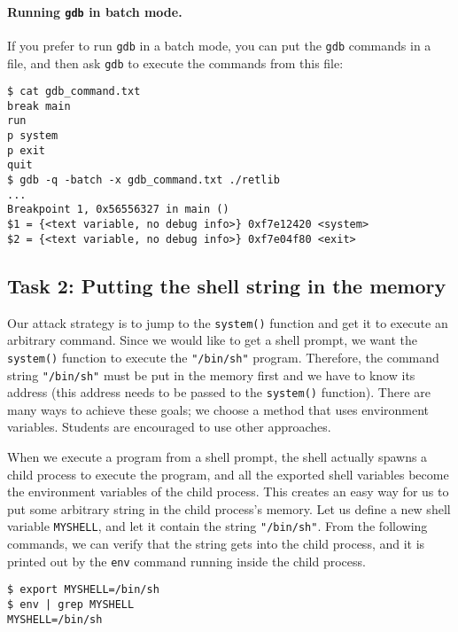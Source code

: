 \paragraph{Running \texttt{gdb} in batch mode.} If you prefer to run \texttt{gdb} 
in a batch mode, you can put the \texttt{gdb} commands in a file, and then 
ask \texttt{gdb} to execute the commands from this file:

\begin{lstlisting}
$ cat gdb_command.txt
break main
run
p system
p exit
quit
$ gdb -q -batch -x gdb_command.txt ./retlib
...
Breakpoint 1, 0x56556327 in main ()
$1 = {<text variable, no debug info>} 0xf7e12420 <system>
$2 = {<text variable, no debug info>} 0xf7e04f80 <exit>
\end{lstlisting}
 



\subsection{Task 2: Putting the shell string in the memory}

Our attack strategy is to jump to the \texttt{system()} function and 
get it to execute an arbitrary command. Since we would like to 
get a shell prompt, we want the \texttt{system()} function
to execute the \texttt{"/bin/sh"} program. Therefore, the 
command string \texttt{"/bin/sh"} must be put in the memory first and 
we have to know its address (this address needs to be passed to 
the \texttt{system()} function). There are many ways to
achieve these goals; we choose a method that uses environment variables.
Students are encouraged to use other approaches. 

When we execute a program from a shell prompt, the shell actually 
spawns a child process to execute the program, and all 
the exported shell variables become the environment variables 
of the child process. This creates an easy way for us to 
put some arbitrary string in the child process's memory. 
Let us define a new shell variable \texttt{MYSHELL}, and let it
contain the string \texttt{"/bin/sh"}. From the following commands,
we can verify that the string gets into the child process, and it is 
printed out by the \texttt{env} command running inside the child process.

\begin{lstlisting}
$ export MYSHELL=/bin/sh
$ env | grep MYSHELL
MYSHELL=/bin/sh
\end{lstlisting}

